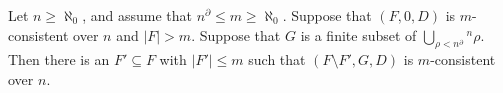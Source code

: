 Let $n \geq \aleph_0$, and assume that $n^{\partial} \leq m \geq \aleph_0$. Suppose that $(F, 0, D)$ is $m$-consistent over $n$ and $|F| > m$. Suppose that $G$ is a finite subset of $\bigcup_{\rho < n^{\partial}} {}^n \rho$. Then there is an $F' \subseteq F$ with $|F'| \leq m$ such that $(F \setminus F', G, D)$ is $m$-consistent over $n$.
